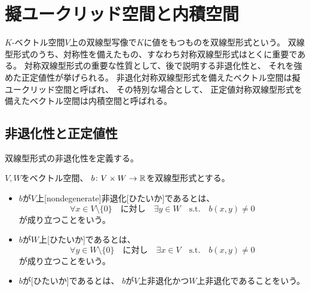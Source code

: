 \documentclass[report]{jlreq}
\begin{document}
%
\chapter{擬ユークリッド空間と内積空間}

$K$-ベクトル空間$V$上の双線型写像で$K$に値をもつものを双線型形式という。
双線型形式のうち、対称性を備えたもの、すなわち対称双線型形式はとくに重要である。
対称双線型形式の重要な性質として、後で説明する非退化性と、
それを強めた正定値性が挙げられる。
非退化対称双線型形式を備えたベクトル空間は擬ユークリッド空間と呼ばれ、
その特別な場合として、
正定値対称双線型形式を備えたベクトル空間は内積空間と呼ばれる。


%
\section{非退化性と正定値性}

双線型形式の非退化性を定義する。

\begin{definition}[非退化形式]
    $V, W$をベクトル空間、
    $b \colon V \times W \to \mathbb{R}$を双線型形式とする。
    \begin{itemize}
        \item $b$が$V$上[nondegenerate]{非退化}[ひたいか]であるとは、
            \begin{equation}
                \forall x \in V \setminus \{ 0 \}
                \quad \text{に対し} \quad
                \exists y \in W
                \quad \text{s.t.} \quad
                b(x, y) \neq 0
            \end{equation}
            が成り立つことをいう。
        \item $b$が$W$上[ひたいか]であるとは、
            \begin{equation}
                \forall y \in W \setminus \{ 0 \}
                \quad \text{に対し} \quad
                \exists x \in V
                \quad \text{s.t.} \quad
                b(x, y) \neq 0
            \end{equation}
            が成り立つことをいう。
        \item $b$が[ひたいか]であるとは、
            $b$が$V$上非退化かつ$W$上非退化であることをいう。
    \end{itemize}
\end{definition}
\end{document}
